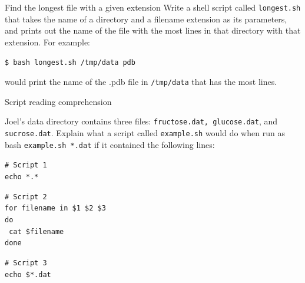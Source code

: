 \documentclass{beamer}
\begin{document}

\begin{frame}{Find the longest file with a given extension}
Write a shell script called \texttt{longest.sh} that takes the name of a directory and a filename extension as its parameters, and prints out the name of the file with the most lines in that directory with that extension. For example:
\vspace{0.5cm}


\begin{beamerboxesrounded}[upper=uppercolgreen,lower=lowercolgreen,shadow=false]{}
\small{\texttt{\$ bash longest.sh /tmp/data pdb}}
\end{beamerboxesrounded}

\vspace{0.5cm}

would print the name of the .pdb file in \texttt{/tmp/data} that has the most lines.
\end{frame}




\begin{frame}{Script reading comprehension}

Joel's data directory contains three files: \texttt{fructose.dat, glucose.dat}, and \texttt{sucrose.dat}. Explain what a script called \texttt{example.sh} would do when run as bash \texttt{example.sh *.dat} if it contained the following lines:
\vspace{0.5cm}


\begin{beamerboxesrounded}[upper=uppercolgreen,lower=lowercolgreen,shadow=false]{}
\small{\texttt{\# Script 1\\
echo *.*}}
\end{beamerboxesrounded}

\begin{beamerboxesrounded}[upper=uppercolgreen,lower=lowercolgreen,shadow=false]{}
\small{\texttt{\# Script 2\\
for filename in \$1 \$2 \$3\\
do\\}
\texttt{         cat \$filename\\}
\texttt{done\\}}
\end{beamerboxesrounded}

\begin{beamerboxesrounded}[upper=uppercolgreen,lower=lowercolgreen,shadow=false]{}
\small{\texttt{\# Script 3\\
echo \$*.dat}}
\end{beamerboxesrounded}


\end{frame}
\end{document}

